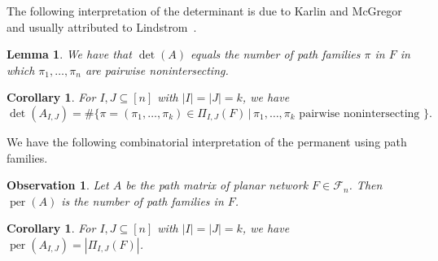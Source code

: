 \documentclass[12pt]{amsart}
\newtheorem{cor}[thm]{Corollary}
\newtheorem{lem}[thm]{Lemma}
\newtheorem{obs}[thm]{Observation}
\theoremstyle{definition}
\numberwithin{equation}{section}
\DeclareMathOperator{\perm}{per}
\newcommand{\F}{\mathcal F}
\begin{document}
The following interpretation of
the determinant is
due to Karlin and McGregor~\cite{KMG}
and usually attributed to Lindstrom~\cite{LinVrep}.

\begin{lem}\label{l:llem}
  We have that $\det(A)$ equals the number of path families $\pi$ in $F$
  in which $\pi_1,\dotsc,\pi_n$ are pairwise nonintersecting.
\end{lem}

\begin{cor}\label{c:llem}
  For $I, J \subseteq [n]$ with $|I| = |J| = k$, we have
  \begin{equation*}
    \det(A_{I,J}) = \# \{ \pi = (\pi_1, \dotsc, \pi_k) \in \Pi_{I,J}(F)
    \,|\, \pi_1,\dotsc,\pi_k \text{ pairwise nonintersecting } \}.
  \end{equation*}
\end{cor}

We have the following combinatorial interpretation of the permanent using path families.

\begin{obs}\label{o:perlem}
  Let $A$ be the path matrix of planar network $F \in \F_n$.
  Then $\perm(A)$ is the number of path families in $F$.
  \end{obs}
\begin{cor}\label{c:perlem}
    For $I, J \subseteq [n]$ with $|I| = |J| = k$, we have
    $\perm(A_{I,J}) = |\Pi_{I,J}(F)|$.
\end{cor}
\end{document}
